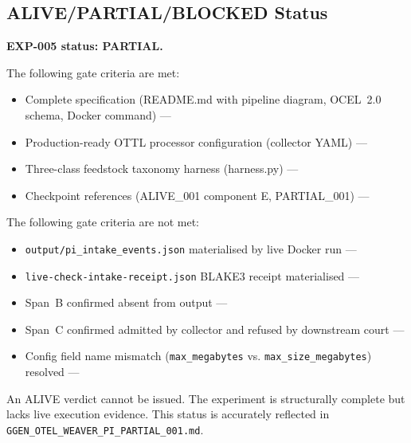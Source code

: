 \subsection{ALIVE/PARTIAL/BLOCKED Status}
\label{sec:otel-weaver-exp-005-collector-to-intake-evidence-status}

\textbf{EXP-005 status: PARTIAL.}

The following gate criteria are met:
\begin{itemize}
  \item Complete specification (README.md with pipeline diagram, OCEL~2.0 schema, Docker
        command) --- \checkmark
  \item Production-ready OTTL processor configuration (collector YAML) --- \checkmark
  \item Three-class feedstock taxonomy harness (harness.py) --- \checkmark
  \item Checkpoint references (ALIVE\_001 component E, PARTIAL\_001) --- \checkmark
\end{itemize}

The following gate criteria are not met:
\begin{itemize}
  \item \texttt{output/pi\_intake\_events.json} materialised by live Docker run --- \texttimes
  \item \texttt{live-check-intake-receipt.json} BLAKE3 receipt materialised --- \texttimes
  \item Span~B confirmed absent from output --- \texttimes
  \item Span~C confirmed admitted by collector and refused by downstream court --- \texttimes
  \item Config field name mismatch (\texttt{max\_megabytes} vs. \texttt{max\_size\_megabytes})
        resolved --- \texttimes
\end{itemize}

An ALIVE verdict cannot be issued. The experiment is structurally complete but lacks live
execution evidence. This status is accurately reflected in \texttt{GGEN\_OTEL\_WEAVER\_PI\_PARTIAL\_001.md}.
